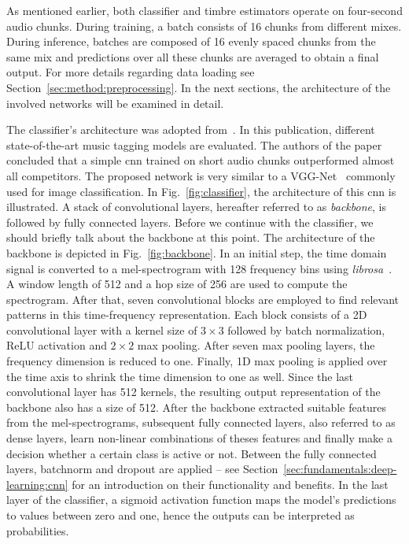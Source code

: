 As mentioned earlier, both classifier and timbre estimators operate on four-second audio chunks. During training, a batch consists of 16 chunks from different mixes. During inference, batches are composed of 16 evenly spaced chunks from the same mix and predictions over all these chunks are averaged to obtain a final output. For more details regarding data loading see Section~\ref{sec:method:preprocessing}. In the next sections, the architecture of the involved networks will be examined in detail.

The classifier's architecture was adopted from~\cite{won2020evaluation}. In this publication, different state-of-the-art music tagging models are evaluated. The authors of the paper concluded that a simple \gls{cnn} trained on short audio chunks outperformed almost all competitors. The proposed network is very similar to a VGG-Net~\cite{simonyan2014very} commonly used for image classification. In Fig.~\ref{fig:classifier}, the architecture of this \gls{cnn} is illustrated. A stack of convolutional layers, hereafter referred to as \textit{backbone}, is followed by fully connected layers. Before we continue with the classifier, we should briefly talk about the backbone at this point. The architecture of the backbone is depicted in Fig.~\ref{fig:backbone}. In an initial step, the time domain signal is converted to a mel-spectrogram with 128 frequency bins using \textit{librosa}~\cite{mcfee2015librosa}. A window length of 512 and a hop size of 256 are used to compute the spectrogram. After that, seven convolutional blocks are employed to find relevant patterns in this time-frequency representation. Each block consists of a 2D convolutional layer with a kernel size of $3\times3$ followed by batch normalization, ReLU activation and $2\times2$ max pooling. After seven max pooling layers, the frequency dimension is reduced to one. Finally, 1D max pooling is applied over the time axis to shrink the time dimension to one as well. Since the last convolutional layer has 512 kernels, the resulting output representation of the backbone also has a size of 512. After the backbone extracted suitable features from the mel-spectrograms, subsequent fully connected layers, also referred to as dense layers, learn non-linear combinations of theses features and finally make a decision whether a certain class is active or not. Between the fully connected layers, batchnorm and dropout are applied -- see Section~\ref{sec:fundamentals:deep-learning:cnn} for an introduction on their functionality and benefits. In the last layer of the classifier, a sigmoid activation function maps the model's predictions to values between zero and one, hence the outputs can be interpreted as probabilities.

